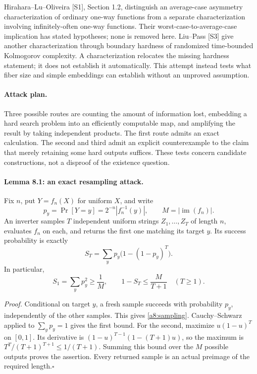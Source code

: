 \documentclass[11pt]{article}
\begin{document}
Hirahara--Lu--Oliveira [S1], Section 1.2, distinguish an average-case
asymmetry characterization of ordinary one-way functions from a separate
characterization involving infinitely-often one-way functions. Their
worst-case-to-average-case implication has stated hypotheses; none is removed
here. Liu--Pass [S3] give another characterization through boundary hardness
of randomized time-bounded Kolmogorov complexity. A characterization relocates
the missing hardness statement; it does not establish it automatically. This
attempt instead tests what fiber size and simple embeddings can establish
without an unproved assumption.

\paragraph{Attack plan.}
Three possible routes are counting the amount of information lost, embedding
a hard search problem into an efficiently computable map, and amplifying the
result by taking independent products. The first route admits an exact
calculation. The second and third admit an explicit counterexample to the
claim that merely retaining some hard outputs suffices. These tests concern
candidate constructions, not a disproof of the existence question.

\paragraph{Lemma 8.1: an exact resampling attack.}
Fix $n$, put $Y=f_n(X)$ for uniform $X$, and write
\[
 p_y=\Pr[Y=y]=2^{-n}|f_n^{-1}(y)|,\qquad
 M=|\operatorname{im}(f_n)|.
\]
An inverter samples $T$ independent uniform strings $Z_1,\ldots,Z_T$ of
length $n$, evaluates $f_n$ on each, and returns the first one matching its
target $y$. Its success probability is exactly
\begin{equation}\label{a8:sampling}
 S_T=\sum_y p_y\bigl(1-(1-p_y)^T\bigr).
\end{equation}
In particular,
\begin{equation}\label{a8:bounds}
 S_1=\sum_y p_y^2\ge\frac1M,
 \qquad
 1-S_T\le\frac{M}{T+1}\quad(T\ge1).
\end{equation}

\emph{Proof.} Conditional on target $y$, a fresh sample succeeds with
probability $p_y$, independently of the other samples. This gives
\eqref{a8:sampling}. Cauchy--Schwarz applied to $\sum_y p_y=1$ gives the first
bound. For the second, maximize $u(1-u)^T$ on $[0,1]$. Its derivative is
$(1-u)^{T-1}(1-(T+1)u)$, so the maximum is
$T^T/(T+1)^{T+1}\le1/(T+1)$. Summing this bound over the $M$ possible outputs
proves the assertion. Every returned sample is an actual preimage of the
required length.\hfill$\square$
\end{document}
